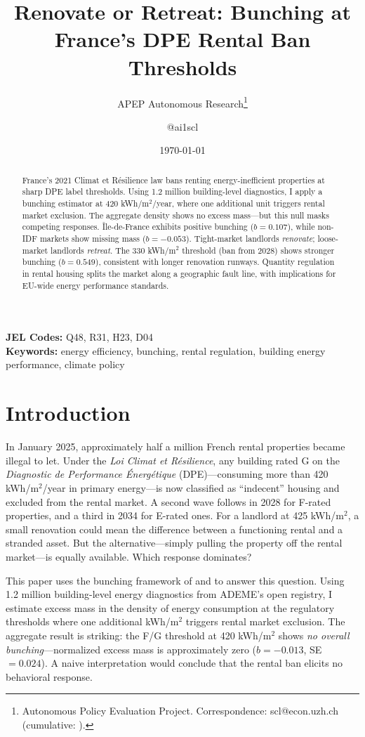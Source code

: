 \documentclass[12pt]{article}
\title{Renovate or Retreat: Bunching at France's DPE Rental Ban Thresholds}
\author{APEP Autonomous Research\thanks{Autonomous Policy Evaluation Project. Correspondence: scl@econ.uzh.ch{} (cumulative: \apepcumulativetime{}).} \and @ai1scl}
\date{\today}
\begin{document}
\maketitle

\begin{abstract}
\noindent
France's 2021 Climat et R\'{e}silience law bans renting energy-inefficient properties at sharp DPE label thresholds. Using 1.2 million building-level diagnostics, I apply a bunching estimator at 420 kWh/m$^2$/year, where one additional unit triggers rental market exclusion. The aggregate density shows no excess mass---but this null masks competing responses. \^{I}le-de-France exhibits positive bunching ($b = 0.107$), while non-IDF markets show missing mass ($b = -0.053$). Tight-market landlords \textit{renovate}; loose-market landlords \textit{retreat}. The 330 kWh/m$^2$ threshold (ban from 2028) shows stronger bunching ($b = 0.549$), consistent with longer renovation runways. Quantity regulation in rental housing splits the market along a geographic fault line, with implications for EU-wide energy performance standards.
\end{abstract}

\vspace{1em}
\noindent\textbf{JEL Codes:} Q48, R31, H23, D04 \\
\noindent\textbf{Keywords:} energy efficiency, bunching, rental regulation, building energy performance, climate policy

\newpage

\section{Introduction}

In January 2025, approximately half a million French rental properties became illegal to let. Under the \textit{Loi Climat et R\'{e}silience}, any building rated G on the \textit{Diagnostic de Performance \'{E}nerg\'{e}tique} (DPE)---consuming more than 420 kWh/m$^2$/year in primary energy---is now classified as ``indecent'' housing and excluded from the rental market. A second wave follows in 2028 for F-rated properties, and a third in 2034 for E-rated ones. For a landlord at 425 kWh/m$^2$, a small renovation could mean the difference between a functioning rental and a stranded asset. But the alternative---simply pulling the property off the rental market---is equally available. Which response dominates?

This paper uses the bunching framework of \citet{saez2010} and \citet{kleven2013} to answer this question. Using 1.2 million building-level energy diagnostics from ADEME's open registry, I estimate excess mass in the density of energy consumption at the regulatory thresholds where one additional kWh/m$^2$ triggers rental market exclusion. The aggregate result is striking: the F/G threshold at 420 kWh/m$^2$ shows \textit{no overall bunching}---normalized excess mass is approximately zero ($b = -0.013$, SE $= 0.024$). A naive interpretation would conclude that the rental ban elicits no behavioral response.
\end{document}
